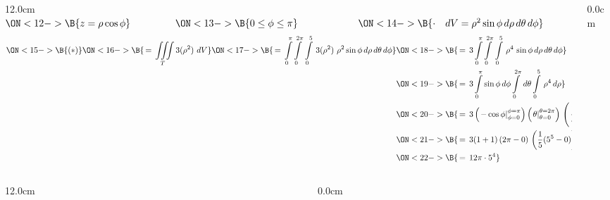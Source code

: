 \begin{frame}
\begin{columns}
\begin{column}{12.0cm}
$\ON<12->{\B{z = \rho \cos \phi}} \hspace{1.6cm} 
\ON<13->{\B{0 \le \phi \le \pi}} \hspace{2.15cm} 
\ON<14->{\B{\cdot \quad dV = \rho^2 \sin \phi \, d\rho \, d\theta \, d\phi}}$ 
\begin{align*}
\ON<15->{\B{(*)}}
\ON<16->{\B{\, = \,\iiint \limits_{T} 3(\rho^2) \,\, dV}}
\ON<17->{\B{\, = \,\int \limits_{0}^{\pi} \int \limits_{0}^{2\pi} \, \int \limits_{0}^{5} \, 3(\rho^2) \,\, \rho^2 \sin \phi \, d\rho \, d\theta \, d\phi}}
&\ON<18->{\B{\, = \,3\int \limits_{0}^{\pi} \int \limits_{0}^{2\pi} \, \int \limits_{0}^{5} \, \rho^4 \, \sin \phi \, d\rho \, d\theta \, d\phi}} \\
&\ON<19->{\B{\, = \,3\int \limits_{0}^{\pi} \sin \phi \, d\phi \int \limits_{0}^{2\pi} \, d\theta \int \limits_{0}^{5} \, \rho^4 \, d\rho}} \\
&\ON<20->{\B{\, = \,3 \left(\left.- \cos \phi \right|_{\phi = 0}^{\phi = \pi}\right) \left(\left. \theta \right|_{\theta = 0}^{\theta = 2\pi}\right) \, \left(\left.\frac{1}{5}\rho^5 \right|_{\rho = 0}^{\rho = 5} \right)}} \\
&\ON<21->{\B{\, = \,3 (1 + 1) \left( 2\pi -0\right) \, \left(\frac{1}{5}(5^5-0) \right)}} \\
&\ON<22->{\B{\, = \,12\pi \cdot 5^4}} \\
\end{align*}

\end{column}\begin{column}{0.0cm}\end{column}\end{columns}
\end{frame}

\begin{frame}
\begin{columns}\begin{column}{12.0cm}
\scriptsize
	
\end{column}\begin{column}{0.0cm}\end{column}\end{columns}
\end{frame}

